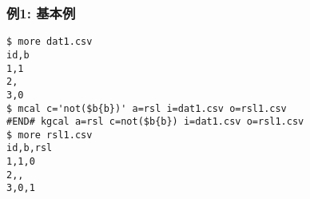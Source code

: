 \subsubsection*{例1: 基本例}



\begin{Verbatim}[baselinestretch=0.7,frame=single]
$ more dat1.csv
id,b
1,1
2,
3,0
$ mcal c='not($b{b})' a=rsl i=dat1.csv o=rsl1.csv
#END# kgcal a=rsl c=not($b{b}) i=dat1.csv o=rsl1.csv
$ more rsl1.csv
id,b,rsl
1,1,0
2,,
3,0,1
\end{Verbatim}
